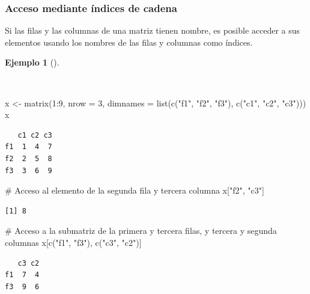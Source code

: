 \documentclass[
  spanish,
  a4paper,
]{scrreport}
\newenvironment{Shaded}{\begin{snugshade}}{\end{snugshade}}
\newcommand{\AttributeTok}[1]{\textcolor[rgb]{0.40,0.45,0.13}{#1}}
\newcommand{\CommentTok}[1]{\textcolor[rgb]{0.37,0.37,0.37}{#1}}
\newcommand{\DecValTok}[1]{\textcolor[rgb]{0.68,0.00,0.00}{#1}}
\newcommand{\FunctionTok}[1]{\textcolor[rgb]{0.28,0.35,0.67}{#1}}
\newcommand{\NormalTok}[1]{\textcolor[rgb]{0.00,0.23,0.31}{#1}}
\newcommand{\OtherTok}[1]{\textcolor[rgb]{0.00,0.23,0.31}{#1}}
\newcommand{\SpecialCharTok}[1]{\textcolor[rgb]{0.37,0.37,0.37}{#1}}
\newcommand{\StringTok}[1]{\textcolor[rgb]{0.13,0.47,0.30}{#1}}
\theoremstyle{definition}
\theoremstyle{definition}
\newtheorem{example}{Ejemplo}[chapter]
\theoremstyle{remark}
\begin{document}
\subsubsection{Acceso mediante índices de
cadena}\label{acceso-mediante-uxedndices-de-cadena}

Si las filas y las columnas de una matriz tienen nombre, es posible
acceder a sus elementos usando los nombres de las filas y columnas como
índices.

\begin{example}[]\protect\hypertarget{exm-acceso-matriz-nombres}{}\label{exm-acceso-matriz-nombres}

~

\begin{Shaded}
\begin{Highlighting}[]
\NormalTok{x }\OtherTok{\textless{}{-}} \FunctionTok{matrix}\NormalTok{(}\DecValTok{1}\SpecialCharTok{:}\DecValTok{9}\NormalTok{, }\AttributeTok{nrow =} \DecValTok{3}\NormalTok{, }\AttributeTok{dimnames =} \FunctionTok{list}\NormalTok{(}\FunctionTok{c}\NormalTok{(}\StringTok{"f1"}\NormalTok{, }\StringTok{"f2"}\NormalTok{, }\StringTok{"f3"}\NormalTok{), }\FunctionTok{c}\NormalTok{(}\StringTok{"c1"}\NormalTok{, }\StringTok{"c2"}\NormalTok{, }\StringTok{"c3"}\NormalTok{)))}
\NormalTok{x}
\end{Highlighting}
\end{Shaded}

\begin{verbatim}
   c1 c2 c3
f1  1  4  7
f2  2  5  8
f3  3  6  9
\end{verbatim}

\begin{Shaded}
\begin{Highlighting}[]
\CommentTok{\# Acceso al elemento de la segunda fila y tercera columna}
\NormalTok{x[}\StringTok{"f2"}\NormalTok{, }\StringTok{"c3"}\NormalTok{]}
\end{Highlighting}
\end{Shaded}

\begin{verbatim}
[1] 8
\end{verbatim}

\begin{Shaded}
\begin{Highlighting}[]
\CommentTok{\# Acceso a la submatriz de la primera y tercera filas, y tercera y segunda columnas}
\NormalTok{x[}\FunctionTok{c}\NormalTok{(}\StringTok{"f1"}\NormalTok{, }\StringTok{"f3"}\NormalTok{), }\FunctionTok{c}\NormalTok{(}\StringTok{"c3"}\NormalTok{, }\StringTok{"c2"}\NormalTok{)]}
\end{Highlighting}
\end{Shaded}

\begin{verbatim}
   c3 c2
f1  7  4
f3  9  6
\end{verbatim}

\end{example}
\end{document}
